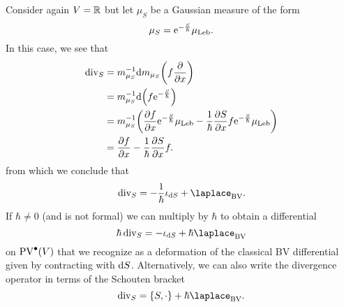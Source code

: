 \begin{example}
  Consider again $V = \mathbb{R}$ but let $\mu_S$ be a Gaussian measure of the form
  \begin{equation*}
    \mu_S = \mathrm{e}^{-\frac{S}{\hbar}} \mu_\text{Leb}.
  \end{equation*}
  In this case, we see that
  \begin{align*}
    \operatorname{div}_S 
    &= m_{\mu_S}^{-1} \mathrm{d} m_{\mu_S} \biggl( f \frac{\partial}{\partial x} \biggr) \\
    &= m_{\mu_S}^{-1} \mathrm{d} \Bigl( f \mathrm{e}^{-\frac{S}{\hbar}} \Bigr) \\
    &= m_{\mu_S}^{-1} \biggl( \frac{\partial f}{\partial  x} \mathrm{e}^{-\frac{S}{\hbar}} \mu_\text{Leb}
    - \frac{1}{\hbar} \frac{\partial S}{\partial x} f \mathrm{e}^{-\frac{S}{\hbar}} \mu_\text{Leb} \biggr) \\
    &= \frac{\partial f}{\partial  x} - \frac{1}{\hbar} \frac{\partial S}{\partial  x} f.
  \end{align*}
  from which we conclude that
  \begin{equation*}
    \divergence_S = - \frac{1}{\hbar} \iota_{\drm S} + \laplace_\text{BV}.
  \end{equation*}
  If $\hbar \neq 0$ (and is not formal) we can multiply by $\hbar$ to obtain a differential
\begin{equation*}
    \hbar \divergence_S = - \iota_{\drm S} + \hbar \laplace_\text{BV}
  \end{equation*}
  on $\operatorname{PV}^{\bullet}(V)$ that we recognize as a deformation of the classical BV differential given by contracting with $\mathrm{d} S$. Alternatively, we can also write the divergence operator in terms of the Schouten bracket
  \begin{equation*}
    \divergence_S = \{ S, \cdot \} + \hbar \laplace_{\text{BV}}.
  \end{equation*}
\end{example}
